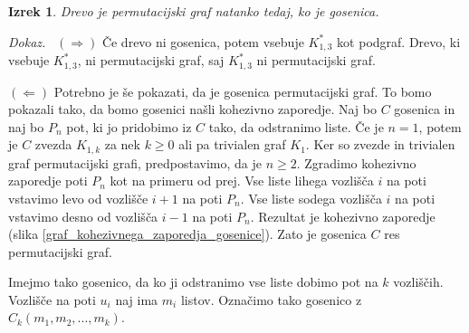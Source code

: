 \documentclass[a4paper, 12pt]{book}
\newtheorem{izrek}{Izrek}[chapter]
\newenvironment{dokaz}{\emph{Dokaz.}\ }{\hspace{\fill}{$\Box$}}
\begin{document}
\begin{izrek}
\label{izrek_gosenica_permutacijski_graf}
    Drevo je permutacijski graf natanko tedaj, ko je gosenica.
\end{izrek}
\begin{dokaz}
    $(\Rightarrow)$ Če drevo ni gosenica, potem vsebuje $K_{1,3}^*$ kot podgraf. Drevo, ki vsebuje $K_{1,3}^*$, ni permutacijski graf, saj $K_{1,3}^*$ ni permutacijski graf. 
    
    $(\Leftarrow)$ Potrebno je še pokazati, da je gosenica permutacijski graf. To bomo pokazali tako, da bomo gosenici našli kohezivno zaporedje. Naj bo $C$ gosenica in naj bo $P_n$ pot, ki jo pridobimo iz $C$ tako, da odstranimo liste. Če je $n=1$, potem je $C$ zvezda $K_{1,k}$ za nek $k \geq 0$ ali pa trivialen graf $K_1$. Ker so zvezde in trivialen graf permutacijski grafi, predpostavimo, da je $n \geq 2$. Zgradimo kohezivno zaporedje poti $P_n$ kot na primeru od prej. Vse liste lihega vozlišča $i$ na poti vstavimo levo od vozlišče $i+1$ na poti $P_n$. Vse liste sodega vozlišča $i$ na poti vstavimo desno od vozlišča $i-1$ na poti $P_n$. Rezultat je kohezivno zaporedje (slika \ref{graf_kohezivnega_zaporedja_gosenice}). Zato je gosenica $C$ res permutacijski graf.    
\end{dokaz}

Imejmo tako gosenico, da ko ji odstranimo vse liste dobimo pot na $k$ vozliščih. Vozlišče na poti $u_i$ naj ima $m_i$ listov. Označimo tako gosenico z $C_k(m_1, m_2, ..., m_k)$.
\end{document}
